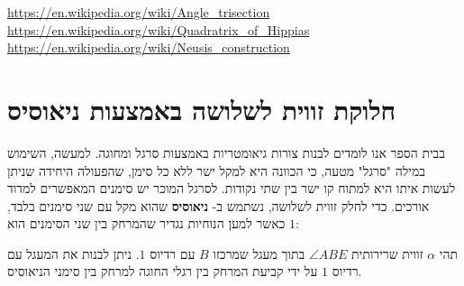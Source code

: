 \documentclass[12pt,a4paper]{article}
\begin{document}
\noindent\url{https://en.wikipedia.org/wiki/Angle_trisection}\\
\url{https://en.wikipedia.org/wiki/Quadratrix_of_Hippias}\\
\url{https://en.wikipedia.org/wiki/Neusis_construction}

\newpage


\section{חלוקת זווית לשלושה באמצעות ניאוסיס}\label{s.neusis}

בבית הספר אנו לומדים לבנות צורות גיאומטריות באמצעות סרגל ומחוגה. למעשה, השימוש במילה "סרגל" מטעה, כי הכוונה היא למקל ישר ללא כל סימן, שהפעולה היחידה שניתן לעשות איתו היא למתוח קו ישר בין שתי נקודות. לסרגל המוכר יש סימנים המאפשרים למדוד אורכים. כדי לחלק זווית לשלושה, נשתמש ב-%
\textbf{ניאוסיס}
שהוא מקל עם שני סימנים בלבד, כאשר למען הנוחיות נגדיר שהמרחק בין שני הסימנים הוא
$1$:
\begin{center}
\end{center}
תהי 
$\alpha$
זווית שרירותית
$\angle ABE$
בתוך מעגל שמרכזו
$B$
עם רדיוס
$1$.
ניתן לבנות את המעגל עם רדיוס
$1$
על ידי קביעת המרחק בין רגלי החוגה למרחק בין סימני הניאוסיס.
\end{document}
